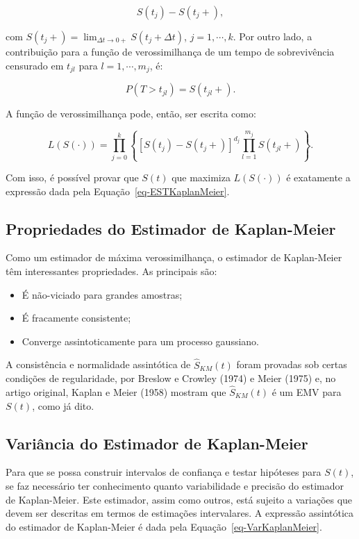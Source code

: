 \documentclass[
  12pt,
  letterpaper,
  DIV=11,
  numbers=noendperiod]{scrreprt}
\providecommand{\tightlist}{%
  \setlength{\itemsep}{0pt}\setlength{\parskip}{0pt}}\usepackage{longtable,booktabs,array}
\begin{document}
\[
S(t_{j}) - S(t_{j}+),
\]

\noindent com
\(S(t_{j}+) = \lim_{\Delta t \to 0+} S(t_{j} + \Delta t)\),
\(j = 1, \cdots, k\). Por outro lado, a contribuição para a função de
verossimilhança de um tempo de sobrevivência censurado em \(t_{jl}\)
para \(l = 1, \cdots, m_{j}\), é:

\[
P(T > t_{jl}) = S(t_{jl}+).
\]

A função de verossimilhança pode, então, ser escrita como:

\[L(S(\cdot)) = \prod_{j = 0}^{k} \left\{ [ S(t_{j}) - S(t_{j}+) ]^{d_{j}} \prod_{l = 1}^{m_{j}} S(t_{jl}+) \right\}.\]

\noindent Com isso, é possível provar que \(S(t)\) que maximiza
\(L(S(\cdot))\) é exatamente a expressão dada pela
Equação~\ref{eq-ESTKaplanMeier}.

\subsection{Propriedades do Estimador de
Kaplan-Meier}\label{propriedades-do-estimador-de-kaplan-meier}

Como um estimador de máxima verossimilhança, o estimador de Kaplan-Meier
têm interessantes propriedades. As principais são:

\begin{itemize}
\tightlist
\item
  É não-viciado para grandes amostras;
\item
  É fracamente consistente;
\item
  Converge assintoticamente para um processo gaussiano.
\end{itemize}

A consistência e normalidade assintótica de \(\hat{S}_{KM}(t)\) foram
provadas sob certas condições de regularidade, por Breslow e Crowley
(1974) e Meier (1975) e, no artigo original, Kaplan e Meier (1958)
mostram que \(\hat{S}_{KM}(t)\) é um EMV para \(S(t)\), como já dito.

\subsection{Variância do Estimador de
Kaplan-Meier}\label{variuxe2ncia-do-estimador-de-kaplan-meier}

Para que se possa construir intervalos de confiança e testar hipóteses
para \(S(t)\), se faz necessário ter conhecimento quanto variabilidade e
precisão do estimador de Kaplan-Meier. Este estimador, assim como
outros, está sujeito a variações que devem ser descritas em termos de
estimações intervalares. A expressão assintótica do estimador de
Kaplan-Meier é dada pela Equação~\ref{eq-VarKaplanMeier}.
\end{document}
